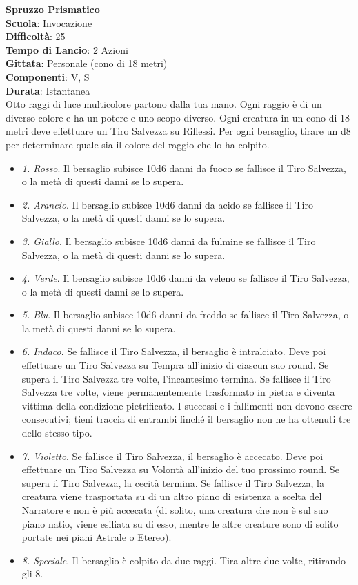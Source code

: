 \begin{multicols}{2}
\medskip\textbf{Spruzzo Prismatico}\\
\textbf{Scuola}: Invocazione\\
\textbf{Difficoltà}:  25\\
\textbf{Tempo di Lancio}: 2 Azioni\\
\textbf{Gittata}: Personale (cono di 18 metri)\\
\textbf{Componenti}: V, S\\
\textbf{Durata}: Istantanea\\
Otto raggi di luce multicolore partono dalla tua mano. Ogni raggio è di un diverso colore e ha un potere e uno scopo diverso. Ogni creatura in un cono di 18 metri deve effettuare un Tiro Salvezza su Riflessi. Per ogni bersaglio, tirare un d8 per determinare quale sia il colore del raggio che lo ha colpito.\\
\medskip
\begin{itemize}
\item
\textit{1. Rosso}. Il bersaglio subisce 10d6 danni da fuoco se fallisce il Tiro Salvezza, o la metà di questi danni se lo supera.
\item
\textit{2. Arancio}. Il bersaglio subisce 10d6 danni da acido se fallisce il Tiro Salvezza, o la metà di questi danni se lo supera.
\item
\textit{3. Giallo}. Il bersaglio subisce 10d6 danni da fulmine se fallisce il Tiro Salvezza, o la metà di questi danni se lo supera.
\item
\textit{4. Verde}. Il bersaglio subisce 10d6 danni da veleno se fallisce il Tiro Salvezza, o la metà di questi danni se lo supera.
\item
\textit{5. Blu}. Il bersaglio subisce 10d6 danni da freddo se fallisce il Tiro Salvezza, o la metà di questi danni se lo supera.
\item
\textit{6. Indaco}. Se fallisce il Tiro Salvezza, il bersaglio è intralciato. Deve poi effettuare un Tiro Salvezza su Tempra all'inizio di ciascun suo round. Se supera il Tiro Salvezza tre volte, l'incantesimo termina. Se fallisce il Tiro Salvezza tre volte, viene permanentemente trasformato in pietra e diventa vittima della condizione pietrificato. I successi e i fallimenti non devono essere consecutivi; tieni traccia di entrambi finché il bersaglio non ne ha ottenuti tre dello stesso tipo.
\item
\textit{7. Violetto}. Se fallisce il Tiro Salvezza, il bersaglio è accecato. Deve poi effettuare un Tiro Salvezza su Volontà all'inizio del tuo prossimo round. Se supera il Tiro Salvezza, la cecità termina. Se fallisce il Tiro Salvezza, la creatura viene trasportata su di un altro piano di esistenza a scelta del Narratore e non è più accecata (di solito, una creatura che non è sul suo piano natio, viene esiliata su di esso, mentre le altre creature sono di solito portate nei piani Astrale o Etereo).
\item
\textit{8. Speciale}. Il bersaglio è colpito da due raggi. Tira altre due volte, ritirando gli 8.
\end{itemize}


\end{multicols}
